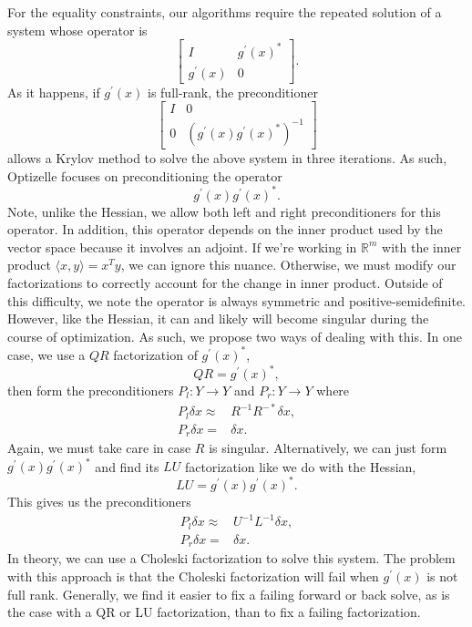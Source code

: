 \documentclass{report}
\newcommand{\re}{\mathbb{R}}
\begin{document}
        For the equality constraints, our algorithms require the repeated solution of a system whose operator is
$$\begin{bmatrix}
        I & g^\prime(x)^*\\
        g^\prime(x) & 0
\end{bmatrix}.$$
As it happens, if $g^\prime(x)$ is full-rank, the preconditioner
$$\begin{bmatrix}
        I & 0\\ 
        0 & (g^\prime(x)g^\prime(x)^*)^{-1} 
\end{bmatrix}$$
allows a Krylov method to solve the above system in three iterations.  As such, Optizelle focuses on preconditioning the operator 
$$
        g^\prime(x)g^\prime(x)^*.
$$
Note, unlike the Hessian, we allow both left and right preconditioners for this operator.  In addition, this operator depends on the inner product used by the vector space because it involves an adjoint.  If we're working in $\re^m$ with the inner product $\langle x,y\rangle = x^Ty$, we can ignore this nuance.  Otherwise, we must modify our factorizations to correctly account for the change in inner product.  Outside of this difficulty, we note the operator is always symmetric and positive-semidefinite.  However, like the Hessian, it can and likely will become singular during the course of optimization.  As such, we propose two ways of dealing with this.  In one case, we use a $QR$ factorization of $g^\prime(x)^*$,
$$
        Q R = g^\prime(x)^*,
$$
then form the preconditioners $P_l: Y\rightarrow Y$ and $P_r: Y\rightarrow Y$ where
\begin{align*}
    P_l \delta x \approx& R^{-1}R^{-*}\delta x,\\
    P_r \delta x =& \delta x .
\end{align*}
Again, we must take care in case $R$ is singular.  Alternatively, we can just form $g^\prime(x)g^\prime(x)^*$ and find its $LU$ factorization like we do with the Hessian,
$$
        LU = g^\prime(x)g^\prime(x)^*.
$$
This gives us the preconditioners
\begin{align*}
        P_l\delta x \approx & U^{-1}L^{-1} \delta x,\\
        P_r\delta x = & \delta x.
\end{align*}
In theory, we can use a Choleski factorization to solve this system.  The problem with this approach is that the Choleski factorization will fail when $g^\prime(x)$ is not full rank.  Generally, we find it easier to fix a failing forward or back solve, as is the case with a QR or LU factorization, than to fix a failing factorization.
\end{document}

